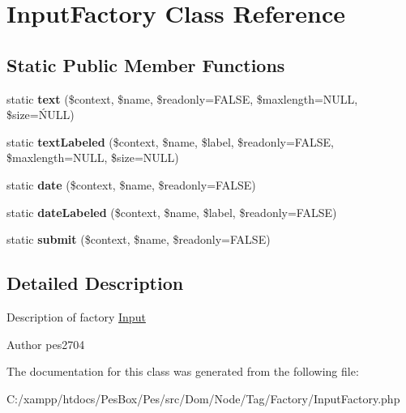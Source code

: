 \hypertarget{class_pes_1_1_dom_1_1_node_1_1_tag_1_1_factory_1_1_input_factory}{}\section{Input\+Factory Class Reference}
\label{class_pes_1_1_dom_1_1_node_1_1_tag_1_1_factory_1_1_input_factory}
\subsection*{Static Public Member Functions}
\begin{DoxyCompactItemize}
\item 
\mbox{\label{class_pes_1_1_dom_1_1_node_1_1_tag_1_1_factory_1_1_input_factory_aa702ef5e273e3e951db56cd32beae002}} 
static {\bfseries text} (\$context, \$name, \$readonly=F\+A\+L\+SE, \$maxlength=N\+U\+LL, \$size=Ń\+U\+LL)
\item 
\mbox{\label{class_pes_1_1_dom_1_1_node_1_1_tag_1_1_factory_1_1_input_factory_ae645d443c33b26952bca78f305c3c8aa}} 
static {\bfseries text\+Labeled} (\$context, \$name, \$label, \$readonly=F\+A\+L\+SE, \$maxlength=N\+U\+LL, \$size=N\+U\+LL)
\item 
\mbox{\label{class_pes_1_1_dom_1_1_node_1_1_tag_1_1_factory_1_1_input_factory_a3e54cf57e4cf2bd18c06237ebead058e}} 
static {\bfseries date} (\$context, \$name, \$readonly=F\+A\+L\+SE)
\item 
\mbox{\label{class_pes_1_1_dom_1_1_node_1_1_tag_1_1_factory_1_1_input_factory_a180698acdebdc26a770d2eab278565b8}} 
static {\bfseries date\+Labeled} (\$context, \$name, \$label, \$readonly=F\+A\+L\+SE)
\item 
\mbox{\label{class_pes_1_1_dom_1_1_node_1_1_tag_1_1_factory_1_1_input_factory_a0436cd63560f7b98dbf723df0400219a}} 
static {\bfseries submit} (\$context, \$name, \$readonly=F\+A\+L\+SE)
\end{DoxyCompactItemize}


\subsection{Detailed Description}
Description of factory \mbox{\hyperlink{class_pes_1_1_dom_1_1_node_1_1_tag_1_1_input}{Input}}

\begin{DoxyAuthor}{Author}
pes2704 
\end{DoxyAuthor}


The documentation for this class was generated from the following file\+:\begin{DoxyCompactItemize}
\item 
C\+:/xampp/htdocs/\+Pes\+Box/\+Pes/src/\+Dom/\+Node/\+Tag/\+Factory/Input\+Factory.\+php\end{DoxyCompactItemize}
